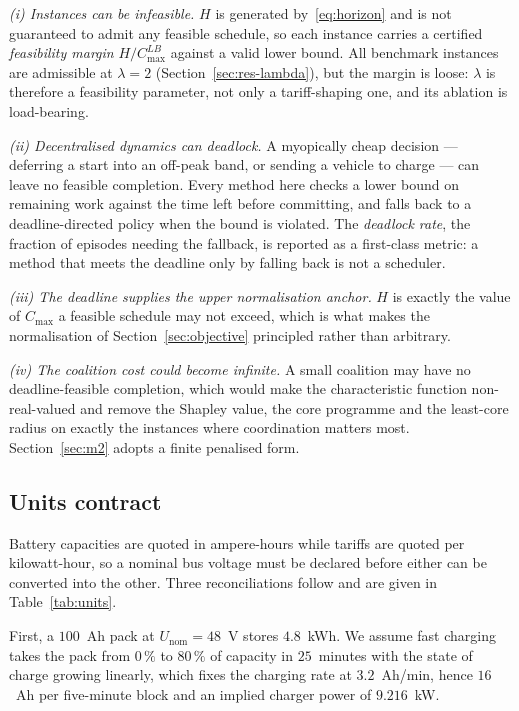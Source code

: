 \documentclass[preprint, 3p, review, 12pt]{elsarticle}
\theoremstyle{definition}
\begin{document}
\emph{(i) Instances can be infeasible.} $H$ is generated by~\eqref{eq:horizon} and is not
guaranteed to admit any feasible schedule, so each instance carries a certified
\emph{feasibility margin} $H/C_{\max}^{LB}$ against a valid lower bound. All
 benchmark instances are admissible at $\lambda=2$
(Section~\ref{sec:res-lambda}), but the margin is loose: $\lambda$ is therefore a
feasibility parameter, not only a tariff-shaping one, and its ablation is load-bearing.

\emph{(ii) Decentralised dynamics can deadlock.} A myopically cheap decision --- deferring a
start into an off-peak band, or sending a vehicle to charge --- can leave no feasible
completion. Every method here checks a lower bound on remaining work against the time left
before committing, and falls back to a deadline-directed policy when the bound is violated.
The \emph{deadlock rate}, the fraction of episodes needing the fallback, is reported as a
first-class metric: a method that meets the deadline only by falling back is not a
scheduler.

\emph{(iii) The deadline supplies the upper normalisation anchor.} $H$ is exactly the value
of $C_{\max}$ a feasible schedule may not exceed, which is what makes the normalisation of
Section~\ref{sec:objective} principled rather than arbitrary.

\emph{(iv) The coalition cost could become infinite.} A small coalition may have no
deadline-feasible completion, which would make the characteristic function non-real-valued
and remove the Shapley value, the core programme and the least-core radius on exactly the
instances where coordination matters most. Section~\ref{sec:m2} adopts a finite penalised
form.

\subsection{Units contract}
\label{sec:units}
Battery capacities are quoted in ampere-hours while tariffs are quoted per kilowatt-hour, so
a nominal bus voltage must be declared before either can be converted into the other. Three
reconciliations follow and are given in Table~\ref{tab:units}.

First, a $100$~Ah pack at $U_{\mathrm{nom}}=48$~V stores $4.8$~kWh. We assume fast charging
takes the pack from $0\,\%$ to $80\,\%$ of capacity in $25$~minutes with the state of charge
growing linearly, which fixes the charging rate at $3.2$~Ah/min, hence $16$~Ah per
five-minute block and an implied charger power of $9.216$~kW.
\end{document}
